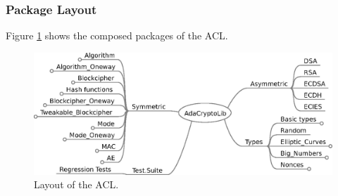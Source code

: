 \subsubsection{Package Layout}
Figure \ref{Layout_of_ACL} shows the composed packages of the ACL.
\begin{figure}[h]
  \centering
  \includegraphics[scale=0.9]{./images/Layout_of_the_ACL}
  \caption{Layout of the ACL.} \label{Layout_of_ACL}
\end{figure}
